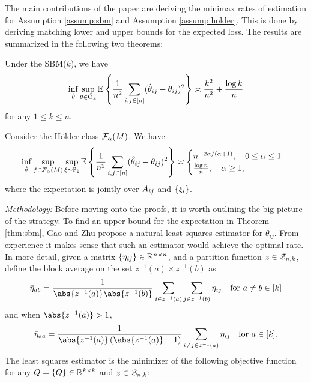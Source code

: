 \documentclass[11pt]{article}
\begin{document}
The main contributions of the paper are deriving the minimax rates of estimation for Assumption \ref{assump:sbm} and Assumption \ref{assump:holder}. This is done by deriving matching lower and upper bounds for the expected loss. The results are summarized in the following two theorems:

\begin{theorem} \label{thm:sbm}
Under the SBM($k$), we have
\begin{equation}
\inf_{\hat{\theta}} \sup_{\theta \in \Theta_k} \mathbb{E}\left\{\frac{1}{n^2} \sum_{i,j \in \lbrack n\rbrack} (\hat{\theta}_{ij} - \theta_{ij})^2\right\} \asymp \frac{k^2}{n^2} + \frac{\log k}{n}
\end{equation}
for any $1 \leq k \leq n$.
\end{theorem}

\begin{theorem}\label{thm:nonparam}
Consider the H\"older class $\mathcal{F}_{\alpha}(M)$. We have
\begin{equation}
\inf_{\hat{\theta}} \sup_{f \in \mathcal{F}_{\alpha}(M)} \sup_{\xi \sim \mathbb{P}_{\xi}}\mathbb{E}\left\{\frac{1}{n^2} \sum_{i,j \in \lbrack n\rbrack} (\hat{\theta}_{ij} - \theta_{ij})^2\right\} \asymp
\begin{cases}
n^{-2\alpha/(\alpha + 1)}, \quad 0 \leq \alpha \leq 1 \\
\frac{\log n}{n}, \quad \alpha \geq 1,
\end{cases}
\end{equation}
where the expectation is jointly over $A_{ij}$ and $\{\xi_i\}$.
\end{theorem}

\noindent
\textit{Methodology:} Before moving onto the proofs, it is worth outlining the big picture of the strategy. To find an upper bound for the expectation in Theorem \ref{thm:sbm}, Gao and Zhu propose a natural least squares estimator for $\theta_{ij}$. From experience it makes sense that such an estimator would achieve the optimal rate. In more detail, given a matrix $\{\eta_{ij}\} \in \mathbb{R}^{n\times n}$, and a partition function $z \in \mathcal{Z}_{n,k}$, define the block average on the set $z^{-1}(a) \times z^{-1}(b)$ as
\begin{equation}
\begin{aligned}
\bar{\eta}_{ab} = \frac{1}{\abs{z^{-1}(a)}\abs{z^{-1}(b)}} \sum_{i \in z^{-1}(a)} \sum_{j \in z^{-1}(b)} \eta_{ij} \quad \text{for } a \neq b \in \brackets{k}
\end{aligned}
\end{equation}
and when $\abs{z^{-1}(a)} > 1$,
\begin{equation}
\begin{aligned}
\bar{\eta}_{aa} = \frac{1}{\abs{z^{-1}(a)}\left( \abs{z^{-1}(a)}-1 \right)} \sum_{i \neq j \in z^{-1}(a)}  \eta_{ij} \quad \text{for } a \in \brackets{k}.
\end{aligned}
\end{equation}
The least squares estimator is the minimizer of the following objective function for any $Q = \{Q\}\in \mathbb{R}^{k\times k}$ and $z \in \mathcal{Z}_{n,k}$:
\end{document}
